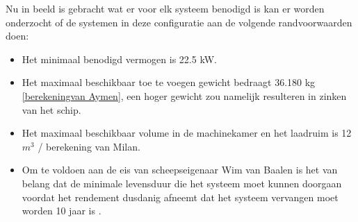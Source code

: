 \begin{table}[h]
\centering
\caption{Berekening Informatie specifieke energieopslag}
\label{tab:prestatievergelijking_uitgebreid}
\end{table}


Nu in beeld is gebracht wat er voor elk systeem benodigd is kan er worden onderzocht of de systemen in deze configuratie aan de volgende randvoorwaarden doen:

\begin{itemize}
    \item Het minimaal benodigd vermogen is 22.5 kW.
    \item Het maximaal beschikbaar toe te voegen gewicht bedraagt 36.180 kg \ref{berekeningvan Aymen}, een hoger gewicht zou namelijk resulteren in zinken van het schip.
    \item Het maximaal beschikbaar volume in de machinekamer en het laadruim is 12 $m^3$ \cite{vanbaalen2026interview}/ berekening van Milan. 
    \item Om te voldoen aan de eis van scheepseigenaar Wim van Baalen is het van belang dat de minimale levensduur die het systeem moet kunnen doorgaan voordat het rendement dusdanig afneemt dat het systeem vervangen moet worden 10 jaar is \cite{vanbaalen2026interview}. 
\end{itemize}


